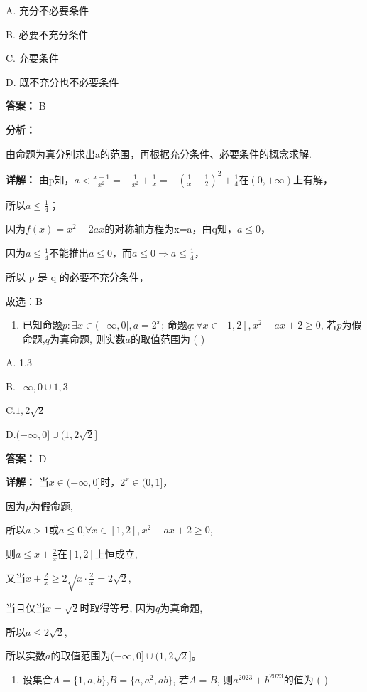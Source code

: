 \documentclass[11pt,a4paper]{ctexart}
\begin{document}
A. 充分不必要条件

B. 必要不充分条件

C. 充要条件

D. 既不充分也不必要条件

\textbf{答案：}
B

\textbf{分析：}

由命题为真分别求出a的范围，再根据充分条件、必要条件的概念求解.

\textbf{详解：}
由p知，\(a<\frac{x-1}{x^{2}}=-\frac{1}{x^{2}}+\frac{1}{x}=-\left(\frac{1}{x}-\frac{1}{2}\right)^{2}+\frac{1}{4}\)在\((0,+\infty)\)上有解，

所以\(a\leq\frac14\)；

因为\(f(x)=x^{2}-2ax\)的对称轴方程为x=a，由q知，\(a\leq0\)，

因为\(a\leq\frac14\)不能推出\(a\leq0\)，而\(a\leq0\Rightarrow a\leq\frac14\)，

所以 p 是 q 的必要不充分条件，

故选：B

\begin{enumerate}[label=\arabic*., leftmargin=*, start=5]
\item 已知命题\(p: \exists x \in (-\infty, 0], a = 2^x\);
  命题\(q: \forall x \in [1, 2], x^2 - ax + 2 \geq 0\),
  若\(p\)为假命题,\(q\)为真命题, 则实数\(a\)的取值范围为 ( )
\end{enumerate}

A. 1,3

B.\(-∞,0∪1,3\)

C.\(1,2\sqrt{2}\)

D.\((-\infty,0]\cup(1,2\sqrt2]\)

\textbf{答案：}
D

\textbf{详解：}
当\(x \in (-\infty, 0]\)时，\(2^x \in (0, 1]\)，

因为\(p\)为假命题,

所以\(a > 1\)或\(a \leq 0\),\(\forall x \in [1,2], x^2 - ax + 2 \geq 0\),

则\(a \leq x + \frac{2}{x}\)在\([1,2]\)上恒成立,

又当\(x + \frac{2}{x} \geq 2\sqrt{x \cdot \frac{2}{x}} = 2\sqrt{2}\),

当且仅当\(x = \sqrt{2}\)时取得等号, 因为\(q\)为真命题,

所以\(a \leq 2\sqrt{2}\),

所以实数\(a\)的取值范围为\((-\infty,0]\cup(1,2\sqrt2]\)。

\begin{enumerate}[label=\arabic*., leftmargin=*, start=6]
\item 设集合\(A = \{1, a, b\}\),\(B = \{a, a^2, ab\}\), 若\(A = B\),
  则\(a^{2023} + b^{2023}\)的值为 ( )
\end{enumerate}
\end{document}
